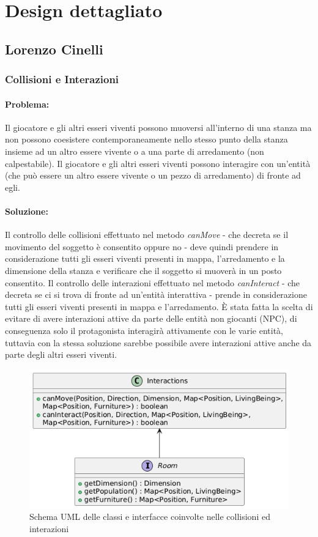 \documentclass[a4paper,12pt]{report}
\begin{document}
\section{Design dettagliato}

\subsection{Lorenzo Cinelli}

\subsubsection{Collisioni e Interazioni}

\paragraph{Problema:} Il giocatore e gli altri esseri viventi possono muoversi all'interno di una stanza ma non possono coesistere 
contemporaneamente nello stesso punto della stanza insieme ad un altro essere vivente o a una parte di arredamento (non calpestabile).
Il giocatore e gli altri esseri viventi possono interagire con un'entità (che può essere un altro essere vivente o un pezzo di arredamento)
di fronte ad egli. 
\paragraph{Soluzione:} Il controllo delle collisioni effettuato nel metodo \textit{canMove} - che decreta se il movimento del soggetto è consentito oppure no - deve quindi prendere 
in considerazione tutti gli esseri viventi presenti in mappa, l'arredamento e la dimensione della stanza e verificare che il soggetto si muoverà in un posto consentito.
Il controllo delle interazioni effettuato nel metodo \textit{canInteract} - che decreta se ci si trova di fronte ad un'entità interattiva - prende in 
considerazione tutti gli esseri viventi presenti in mappa e l'arredamento. 
È stata fatta la scelta di evitare di avere interazioni attive da parte delle entità non giocanti (NPC), di conseguenza solo il protagonista interagirà
attivamente con le varie entità, tuttavia con la stessa soluzione sarebbe possibile avere interazioni attive anche da parte degli altri esseri viventi.
\begin{figure}[H]
	\centering{}
	\includegraphics[width=\textwidth]{img/lorenzo/interactions.png}
	\caption{Schema UML delle classi e interfacce coinvolte nelle collisioni ed interazioni}
	\label{img:template}
\end{figure}
\end{document}
